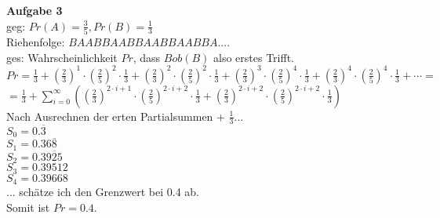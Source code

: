 \documentclass[a4paper]{scrartcl}
\begin{document}
	\begin{flushleft}
		\textbf{Aufgabe 3}\\
		geg: $Pr(A)=\frac{3}{5}, Pr(B)=\frac{1}{3}$\\
		Riehenfolge: $BAABBAABBAABBAABBA....$\\
		ges: Wahrscheinlichkeit $Pr$, dass $Bob(B)$ also erstes Trifft.\\[1em]
		$Pr=\frac{1}{3}+(\frac{2}{3})^1\cdot(\frac{2}{5})^2\cdot\frac{1}{3}+(\frac{2}{3})^2\cdot(\frac{2}{5})^2\cdot\frac{1}{3}+(\frac{2}{3})^3\cdot(\frac{2}{5})^4\cdot\frac{1}{3}+(\frac{2}{3})^4\cdot(\frac{2}{5})^4\cdot\frac{1}{3}+\cdots=$\\
		$=\frac{1}{3}+\sum\limits_{i=0}^{\infty}((\frac{2}{3})^{2\cdot i+1}\cdot(\frac{2}{5})^{2\cdot i+2}\cdot\frac{1}{3} + (\frac{2}{3})^{2\cdot i+2}\cdot(\frac{2}{5})^{2\cdot i+2}\cdot\frac{1}{3})$\\
		Nach Ausrechnen der erten Partialsummen + $\frac{1}{3}$...\\
		$S_0 = 0.\overline{3}$\\
		$S_1 = 0.36\overline{8}$\\
		$S_2 = 0.3\overline{925}$\\
		$S_3 = 0.39512$\\
		$S_4 = 0.39668$\\
		... schätze ich den Grenzwert bei 0.4 ab.\\
		Somit ist $Pr=0.4$.\\
 	\end{flushleft}
\end{document}
